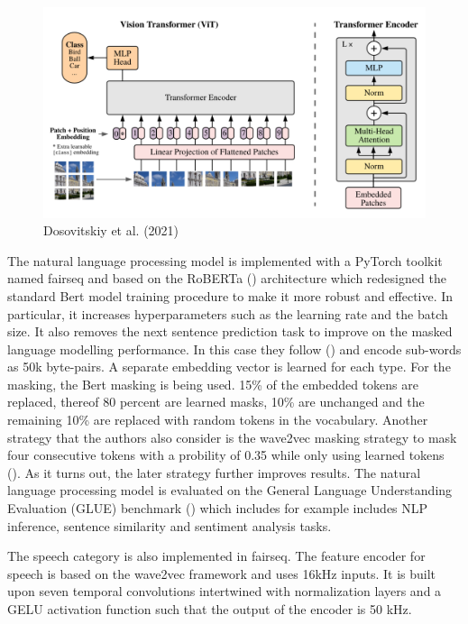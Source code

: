 \documentclass[
]{krantz}
\begin{document}
\begin{figure}

{\centering \includegraphics[width=1\linewidth]{figures/05-chapter2/visiontransformer} 

}

\caption{Dosovitskiy et al. (2021)}\label{fig:visiontransformer}
\end{figure}

The natural language processing model is implemented with a PyTorch toolkit named fairseq and based on the RoBERTa (\citet{liu2019roberta}) architecture which redesigned the standard Bert model training procedure to make it more robust and effective. In particular,
it increases hyperparameters such as the learning rate and the batch size. It also removes the next sentence prediction task to improve on the masked language modelling performance.
In this case they follow (\citet{sennrich2015neural}) and encode sub-words as 50k byte-pairs. A separate embedding vector is learned for each type. For the masking, the Bert masking is being used. 15\% of the embedded tokens are replaced,
thereof 80 percent are learned masks, 10\% are unchanged and the remaining 10\% are replaced with random tokens in the vocabulary. Another strategy that the authors also consider is the wave2vec masking strategy
to mask four consecutive tokens with a probility of 0.35 while only using learned tokens (\citet{baevski2020wav2vec}). As it turns out, the later strategy further improves results. The natural language processing model is evaluated on
the General Language Understanding Evaluation (GLUE) benchmark (\citet{wang2018glue}) which includes for example includes NLP inference, sentence similarity and sentiment analysis tasks.

The speech category is also implemented in fairseq. The feature encoder for speech is based on the wave2vec framework and uses 16kHz inputs. It is built upon seven temporal convolutions intertwined with normalization layers
and a GELU activation function such that the output of the encoder is 50 kHz.
\end{document}
